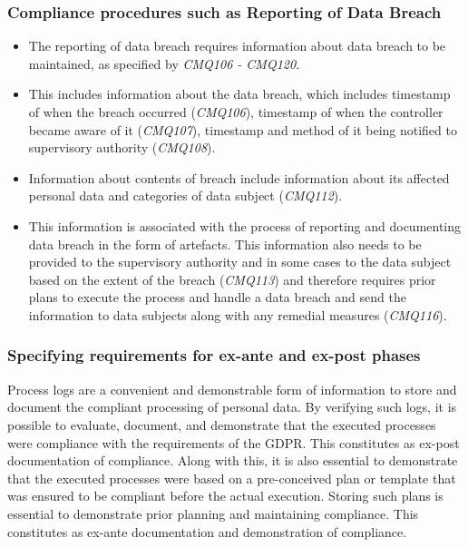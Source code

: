 \subsubsection{Compliance procedures such as Reporting of Data Breach}
\begin{itemize}
    \item The reporting of data breach requires information about data breach to be maintained, as specified by \textit{CMQ106 - CMQ120}.
    \item This includes information about the data breach, which includes timestamp of when the breach occurred (\textit{CMQ106}), timestamp of when the controller became aware of it (\textit{CMQ107}), timestamp and method of it being notified to supervisory authority (\textit{CMQ108}).
    \item Information about contents of breach include information about its affected personal data and categories of data subject (\textit{CMQ112}).
    \item This information is associated with the process of reporting and documenting data breach in the form of artefacts. This information also needs to be provided to the supervisory authority and in some cases to the data subject based on the extent of the breach (\textit{CMQ113}) and therefore requires prior plans to execute the process and handle a data breach and send the information to data subjects along with any remedial measures (\textit{CMQ116}).
\end{itemize}

\subsubsection{Specifying requirements for ex-ante and ex-post phases}
Process logs are a convenient and demonstrable form of information to store and document the compliant processing of personal data. By verifying such logs, it is possible to evaluate, document, and demonstrate that the executed processes were compliance with the requirements of the GDPR. This constitutes as ex-post documentation of compliance. Along with this, it is also essential to demonstrate that the executed processes were based on a pre-conceived plan or template that was ensured to be compliant before the actual execution. Storing such plans is essential to demonstrate prior planning and maintaining compliance. This constitutes as ex-ante documentation and demonstration of compliance.

